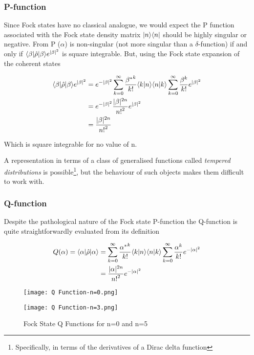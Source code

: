 \subsubsection{P-function}
Since Fock states have no classical analogue, we would expect the P function associated with the Fock state density matrix $| n \rangle\langle n |$ should be highly singular or negative.
From \cite{Mehta1967}  P ($\alpha$) is non-singular (not more singular than a $\delta$-function) if and only if $ \langle\beta | \hat{\rho} | \beta \rangle e^{|\beta|^2} $ is square integrable.
But, using the Fock state expansion of the coherent states

\begin{align}
	 \langle\beta | \hat{\rho} | \beta \rangle e^{|\beta|^2}  &= e^{-|\beta|^2} \sum_{k=0}^\infty \frac {{\beta^*}^k}{k!} \langle k | n \rangle\langle n | k \rangle \sum_{k=0}^\infty \frac {\beta^k}{k!}e^{|\beta|^2} \\ &= e^{-|\beta|^2} \frac{|\beta|^{2n}}{{n!}^2} e^{|\beta|^2} \\ &= \frac{|\beta|^{2n}}{{n!}^2}
\end{align}

Which is square integrable for no value of n.

A representation in terms of a class of generalised functions called \emph{tempered distributions} is possible\footnote{Specifically, in terms of the derivatives of a Dirac delta function\cite{Gerry2005}}, but the behaviour of such objects makes them difficult to work with.

\subsubsection{Q-function}
Despite the pathological nature of the Fock state P-function the Q-function is quite straightforwardly evaluated from its definition

\begin{align}
	 Q(\alpha) = \langle\alpha | \hat{\rho} | \alpha \rangle  &= \sum_{k=0}^\infty \frac {{\alpha^*}^k}{k!} \langle k | n \rangle\langle n | k \rangle \sum_{k=0}^\infty \frac {\alpha^k}{k!}e^{-|\alpha|^2} \\ &= \frac{|\alpha|^{2n}}{{n!}^2} e^{-|\alpha|^2}
\end{align}

\begin{figure}[ht]
	\begin{minipage}[b]{.5\linewidth}
        \centering \large \texttt{[image: Q Function-n=0.png]}
	\end{minipage}%
	\begin{minipage}[b]{.5\linewidth}
		\centering\large \texttt{[image: Q Function-n=3.png]}
	\end{minipage}
  \caption{Fock State Q Functions for n=0 and n=5}\label{Qfunctions}
\end{figure}


